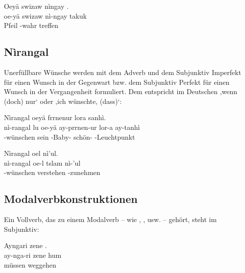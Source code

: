 \begin{interlin}
	\glll \Npawl{}Oeyä swizaw nìngay . \\
	oe-yä swizaw nì-ngay takuk \\
	 Pfeil -wahr treffen \\
\end{interlin}

\subsection{Nìrangal} Unerfüllbare Wünsche werden mit dem Adverb  und dem Subjunktiv Imperfekt für einen Wunsch in der Gegenwart bzw. dem Subjunktiv Perfekt für einen Wunsch in der Vergangenheit formuliert. Dem entspricht im Deutschen ,wenn (doch) nur‘ oder ,ich wünschte, (dass)‘: 

\begin{interlin}
	\glll Nìrangal  oeyä frrnenur lora sanhì. \\
	nì-rangal lu oe-yä ay-prrnen-ur lor-a ay-tanhì  \\
	-wünschen sein  -Baby- schön- -Leuchtpunkt \\
\end{interlin}

\begin{interlin}
	\glll Nìrangal oel  nì'ul. \\
	nì-rangal oe-l tslam nì-'ul  \\
	-wünschen  verstehen -zunehmen \\
\end{interlin}

\subsection{Modalverbkonstruktionen} 
Ein Vollverb, das zu einem Modalverb -- wie  ,  , usw. -- gehört, steht im Subjunktiv:\label{syn:modals}

\begin{interlin}
	\glll Ayngari zene . \\
	ay-nga-ri zene hum  \\
	 müssen weggehen \\
\end{interlin}

